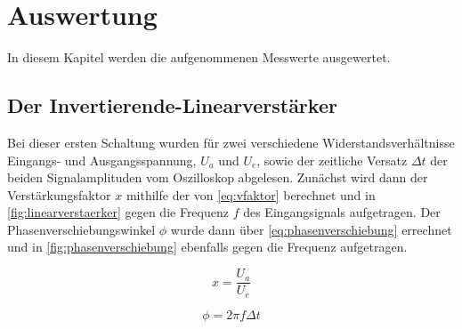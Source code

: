 


\section{Auswertung}
\label{sec:auswertung}

In diesem Kapitel werden die aufgenommenen Messwerte ausgewertet.
\subsection{Der Invertierende-Linearverstärker}
\label{sec:linearverstaerker}
Bei dieser ersten Schaltung wurden für zwei verschiedene Widerstandsverhältnisse Eingangs- und Ausgangsspannung,
$U_a$ und $U_e$, sowie der zeitliche Versatz $\Delta t$ der beiden Signalamplituden vom Oszilloskop abgelesen. 
Zunächst wird dann der Verstärkungsfaktor $x$ mithilfe der von \autoref{eq:vfaktor} berechnet und in 
\autoref{fig:linearverstaerker} gegen die Frequenz $f$ des Eingangsignals aufgetragen. Der Phasenverschiebungswinkel
$\phi$ wurde dann über \autoref{eq:phasenverschiebung} errechnet und in \autoref{fig:phasenverschiebung} 
ebenfalls gegen die Frequenz aufgetragen.

\begin{equation}
    \label{eq:vfaktor}
    x=\frac{U_a}{U_e}
\end{equation}

\begin{equation}
    \label{eq:phasenverschiebung}
    \phi=2\pi f \Delta t
\end{equation}

